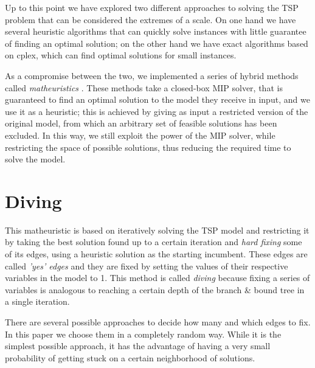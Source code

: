 Up to this point we have explored two different approaches to solving the TSP problem that can be considered the extremes of a scale. On one hand we have several heuristic algorithms that can quickly solve instances with little guarantee of finding an optimal solution; on the other hand we have exact algorithms based on cplex, which can find optimal solutions for small instances.

As a compromise between the two, we implemented a series of hybrid methods called \textit{matheuristics} \cite{Fischetti2016}. These methods take a closed-box MIP solver, that is guaranteed to find an optimal solution to the model they receive in input, and we use it as a heuristic; this is achieved by giving as input a restricted version of the original model, from which an arbitrary set of feasible solutions has been excluded. In this way, we still exploit the power of the MIP solver, while restricting the space of possible solutions, thus reducing the required time to solve the model.

\section{Diving}

This matheuristic is based on iteratively solving the TSP model and restricting it by taking the best solution found up to a certain iteration and \textit{hard fixing} some of its edges, using a heuristic solution as the starting incumbent. These edges are called \textit{'yes' edges} and they are fixed by setting the values of their respective variables in the model to 1. This method is called \textit{diving} because fixing a series of variables is analogous to reaching a certain depth of the branch \& bound tree in a single iteration.

There are several possible approaches to decide how many and which edges to fix. In this paper we choose them in a completely random way. While it is the simplest possible approach, it has the advantage of having a very small probability of getting stuck on a certain neighborhood of solutions.

\newpage

